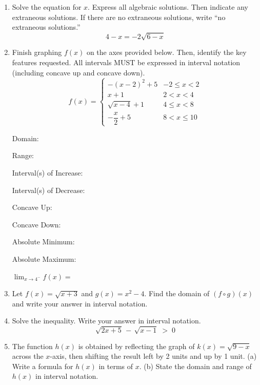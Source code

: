 \begin{enumerate}[leftmargin=*, label=\textbf{\arabic*.}, resume]
  \item Solve the equation for $x$. Express all algebraic solutions. Then indicate any extraneous solutions. If there are no extraneous solutions, write ``no extraneous solutions.'' 
  \[
  4 - x = -2\sqrt{6-x}
  \]
  \vgappp


  \newpage
  \item Finish graphing $f(x)$ on the axes provided below. Then, identify the key features requested. All intervals MUST be expressed in interval notation (including concave up and concave down). 
  \[
  f(x)= \begin{cases}
    -(x-2)^{2}+5 & -2 \leq x<2 \\
    x+1 & 2<x<4 \\
    \sqrt{x-4}+1 & 4 \leq x<8 \\
    -\dfrac{x}{2}+5 & 8<x \leq 10
  \end{cases}
  \]

  \begin{center}
  \end{center}

  Domain: \blank

  Range: \blank

  Interval(s) of Increase: \blank

  Interval(s) of Decrease: \blank

  Concave Up: \blank

  Concave Down: \blank

  Absolute Minimum: \blank

  Absolute Maximum: \blank

  $\displaystyle \lim_{x \to 4^{-}} f(x) = $ \blank
  \vgapp


  \newpage
  \item Let $f(x)=\sqrt{x+3}$ and $g(x)=x^2-4$. Find the domain of $(f \circ g)(x)$ and write your answer in interval notation. 
  \vgappp

  \item Solve the inequality. Write your answer in interval notation.
  \[
  \sqrt{2x+5} \,-\, \sqrt{x-1} \;>\; 0
  \]
  \vgappp

  \item The function $h(x)$ is obtained by reflecting the graph of $k(x)=\sqrt{9-x}$ across the $x$-axis, then shifting the result left by 2 units and up by 1 unit. (a) Write a formula for $h(x)$ in terms of $x$. (b) State the domain and range of $h(x)$ in interval notation. 
  \vgappp

\end{enumerate}
